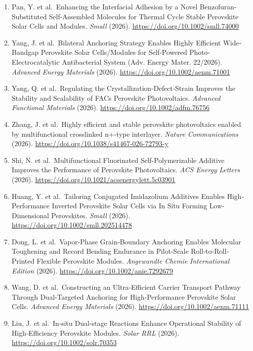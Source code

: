 \documentclass[
  11pt,
]{article}
\begin{document}
\begin{enumerate}
  \url{https://doi.org/10.1038/s41467-026-74288-2}
\item
  Pan, Y. et al.~Enhancing the Interfacial Adhesion by a Novel
  Benzofuran‐Substituted Self‐Assembled Molecules for Thermal Cycle
  Stable Perovskite Solar Cells and Modules. \emph{Small} (2026).
  \url{https://doi.org/10.1002/smll.74000}
\item
  Yang, J. et al.~Bilateral Anchoring Strategy Enables Highly Efficient
  Wide‐Bandgap Perovskite Solar Cells/Modules for Self‐Powered
  Photo‐Electrocatalytic Antibacterial System (Adv. Energy Mater.
  22/2026). \emph{Advanced Energy Materials} (2026).
  \url{https://doi.org/10.1002/aenm.71001}
\item
  Yang, Q. et al.~Regulating the Crystallization‐Defect‐Strain Improves
  the Stability and Scalability of FACs Perovskite Photovoltaics.
  \emph{Advanced Functional Materials} (2026).
  \url{https://doi.org/10.1002/adfm.76756}
\item
  Zhang, J. et al.~Highly efficient and stable perovskite photovoltaics
  enabled by multifunctional crosslinked n+-type interlayer.
  \emph{Nature Communications} (2026).
  \url{https://doi.org/10.1038/s41467-026-72793-y}
\item
  Shi, N. et al.~Multifunctional Fluorinated Self-Polymerizable Additive
  Improves the Performance of Perovskite Photovoltaics. \emph{ACS Energy
  Letters} (2026). \url{https://doi.org/10.1021/acsenergylett.5c03901}
\item
  Huang, Y. et al.~Tailoring Conjugated Imidazolium Additives Enables
  High‐Performance Inverted Perovskite Solar Cells via In Situ Forming
  Low‐Dimensional Perovskites. \emph{Small} (2026).
  \url{https://doi.org/10.1002/smll.202514478}
\item
  Dong, L. et al.~Vapor‐Phase Grain‐Boundary Anchoring Enables Molecular
  Toughening and Record Bending Endurance in Pilot‐Scale
  Roll‐to‐Roll‐Printed Flexible Perovskite Modules. \emph{Angewandte
  Chemie International Edition} (2026).
  \url{https://doi.org/10.1002/anie.7292679}
\item
  Wang, D. et al.~Constructing an Ultra‐Efficient Carrier Transport
  Pathway Through Dual‐Targeted Anchoring for High‐Performance
  Perovskite Solar Cells. \emph{Advanced Energy Materials} (2026).
  \url{https://doi.org/10.1002/aenm.71111}
\item
  Liu, J. et al.~In‐situ Dual‐stage Reactions Enhance Operational
  Stability of High‐Efficiency Perovskite Modules. \emph{Solar RRL}
  (2026). \url{https://doi.org/10.1002/solr.70353}

\end{enumerate}
\end{document}
